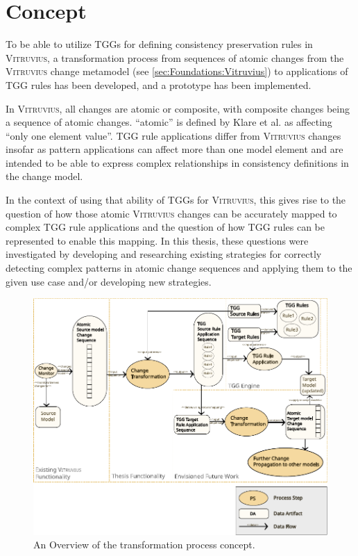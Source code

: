 
\chapter{Concept}
\label{ch:Concept}
To be able to utilize TGGs for defining consistency preservation rules in \textsc{Vitruvius}, a transformation process from sequences of atomic changes from the \textsc{Vitruvius} change metamodel (see \autoref{sec:Foundations:Vitruvius}) to applications of TGG rules has been developed, and a prototype has been implemented.

In \textsc{Vitruvius}, all changes are atomic or composite, with composite changes being a sequence of atomic changes. \enquote{atomic} is defined by Klare et al. \cite{VitruviusKlare2021} as affecting \enquote{only one element value}. 
TGG rule applications differ from \textsc{Vitruvius} changes insofar as pattern applications can affect more than one model element and are intended to be able to express complex relationships in consistency definitions in the change model.

In the context of using that ability of TGGs for \textsc{Vitruvius}, this gives rise to the question of how those atomic \textsc{Vitruvius} changes can be accurately mapped to complex TGG rule applications and the question of how TGG rules can be represented to enable this mapping.
In this thesis, these questions were investigated by developing and researching existing strategies for correctly detecting complex patterns in atomic change sequences and applying them to the given use case and/or developing new strategies.

\begin{figure}
\centering
\includegraphics[width=15cm]{figures/concept-overview.pdf}
\caption{An Overview of the transformation process concept.}
\label{fig:ConceptOverview}
\end{figure}

